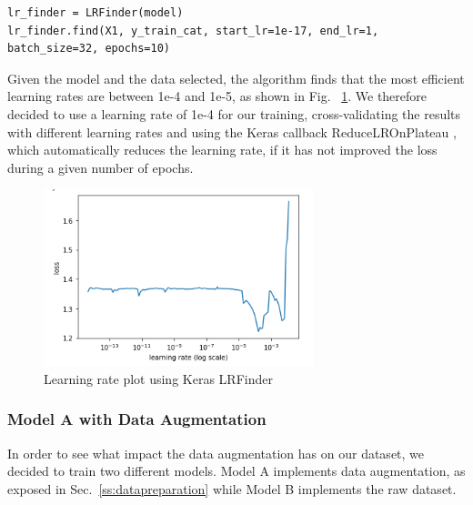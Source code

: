 \documentclass[12pt,a4paper]{scrartcl}
\begin{document}
\begin{lstlisting}[caption={Learning Rate Finder, the jupyter-notebook \emph{Learning\_Rate\_Finder.ipynb} is used to find the learning rate}, label={lst:learning-rate-finder}]
lr_finder = LRFinder(model)
lr_finder.find(X1, y_train_cat, start_lr=1e-17, end_lr=1, batch_size=32, epochs=10)
\end{lstlisting}

Given the model and the data selected, the algorithm finds that the most efficient learning rates are between 1e-4 and 1e-5, as shown in Fig.~ \ref{fig:lr_plot}. We therefore decided to use a learning rate of 1e-4 for our training, cross-validating the results with different learning rates and using the Keras callback ReduceLROnPlateau \cite{chollet2015keras}, which automatically reduces the learning rate, if it has not improved the loss during a given number of epochs.


\begin{figure}[H]
    \centering
    \includegraphics[width=0.7\textwidth]{./images/learning_rate_plot.png}
    \caption{Learning rate plot using Keras LRFinder}
    \label{fig:lr_plot}
\end{figure}

\subsubsection{Model A with Data Augmentation}
In order to see what impact the data augmentation has on our dataset, we decided to train two different models. Model A implements data augmentation, as exposed in Sec.~\ref{ss:datapreparation} while Model B implements the raw dataset.
\end{document}

